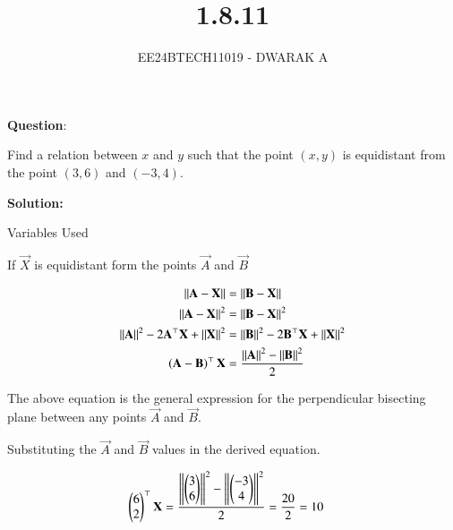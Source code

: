 \documentclass[journal]{IEEEtran}
\begin{document}

\vspace{3cm}

\title{1.8.11}
\author{EE24BTECH11019 - DWARAK A}
{\let\newpage\relax\maketitle}

\renewcommand{\thefigure}{\theenumi}
\renewcommand{\thetable}{\theenumi}
\setlength{\intextsep}{10pt} %


\renewcommand{\thetable}{\theenumi}


\textbf{Question}:

Find a relation between $x$ and $y$ such that the point $(x, y)$ is equidistant from the point $(3, 6)$ and $(-3, 4)$.

\textbf{Solution: }
\begin{table}[h!]    
  \centering
  
  \caption{Variables Used}
  \label{tab1.8.11.1}
\end{table}

If $\vec{X}$ is equidistant form the points $\vec{A}$ and $\vec{B}$

\begin{align}
	\left\lVert\mathbf{A}-\mathbf{X}\right\rVert&=\left\lVert\mathbf{B}-\mathbf{X}\right\rVert\\
	\left\lVert\mathbf{A}-\mathbf{X}\right\rVert^2&=\left\lVert\mathbf{B}-\mathbf{X}\right\rVert^2\\
	\left\lVert\mathbf{A}\right\rVert^2-2\mathbf{A}^\top\mathbf{X}+\left\lVert\mathbf{X}\right\rVert^2&=\left\lVert\mathbf{B}\right\rVert^2-2\mathbf{B}^\top\mathbf{X}+\left\lVert\mathbf{X}\right\rVert^2\\
	\left(\mathbf{A}-\mathbf{B}\right)^\top\mathbf{X}&=\frac{\left\lVert\mathbf{A}\right\rVert^2-\left\lVert\mathbf{B}\right\rVert^2}{2}
\end{align}

The above equation is the general expression for the perpendicular bisecting plane between any points $\vec{A}$ and $\vec{B}$.

Substituting the $\vec{A}$ and $\vec{B}$ values in the derived equation.

\begin{align}
	\begin{pmatrix}6 \\ 2\end{pmatrix}^\top\mathbf{X} &= \frac{\left\lVert\begin{pmatrix}3 \\ 6\end{pmatrix}\right\rVert^2-\left\lVert\begin{pmatrix}-3 \\ 4\end{pmatrix}\right\rVert^2}{2}=\frac{20}{2}=10
\end{align}
\end{document}

